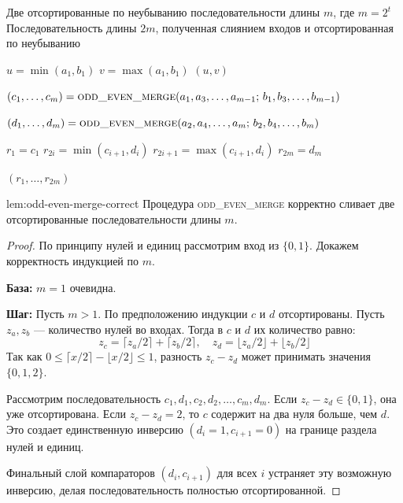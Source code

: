 \begin{algorithm}[H]
	\caption{\textsc{odd\_even\_merge}$(a_1,\dots,a_m;\, b_1,\dots,b_m)$}
	\begin{algorithmic}[1]
		\Require Две отсортированные по неубыванию последовательности длины $m$, где $m=2^t$
		\Ensure Последовательность длины $2m$, полученная слиянием входов и отсортированная по неубыванию
		
		\State $u = \min(a_1,b_1)$
		\State $v = \max(a_1,b_1)$
		\State \Return $(u,v)$
		\EndIf
		
		\State $(c_1,\dots,c_m) = \textsc{odd\_even\_merge}(a_1,a_3,\dots,a_{m-1};\, b_1,b_3,\dots,b_{m-1})$
		
		\State $(d_1,\dots,d_m) = \textsc{odd\_even\_merge}(a_2,a_4,\dots,a_m;\, b_2,b_4,\dots,b_m)$
		
		\State $r_1 = c_1$
		\State $r_{2i} = \min(c_{i+1}, d_i)$
		\State $r_{2i+1} = \max(c_{i+1}, d_i)$
		\EndFor
		\State $r_{2m} = d_m$
		
		\State \Return $(r_1,\dots,r_{2m})$
	\end{algorithmic}
\end{algorithm}


\begin{Lemma}{}{lem:odd-even-merge-correct}
	Процедура \textsc{odd\_even\_merge} корректно сливает две отсортированные последовательности длины $m$.
\end{Lemma}

\begin{proof}
	По принципу нулей и единиц рассмотрим вход из $\{0,1\}$. Докажем корректность индукцией по $m$.
	
	\textbf{База:} $m=1$ очевидна.
	
	\textbf{Шаг:} Пусть $m > 1$. По предположению индукции $c$ и $d$ отсортированы. Пусть $z_a, z_b$ — количество нулей во входах. Тогда в $c$ и $d$ их количество равно:
	\[ z_c = \lceil z_a/2 \rceil + \lceil z_b/2 \rceil, \quad z_d = \lfloor z_a/2 \rfloor + \lfloor z_b/2 \rfloor \]
	Так как $0 \le \lceil x/2 \rceil - \lfloor x/2 \rfloor \le 1$, разность $z_c - z_d$ может принимать значения $\{0, 1, 2\}$.
	
	Рассмотрим последовательность $c_1, d_1, c_2, d_2, \dots, c_m, d_m$. 
	Если $z_c - z_d \in \{0, 1\}$, она уже отсортирована. Если $z_c - z_d = 2$, то $c$ содержит на два нуля больше, чем $d$. Это создает единственную инверсию $(d_i=1, c_{i+1}=0)$ на границе раздела нулей и единиц. 
	
	Финальный слой компараторов $(d_i, c_{i+1})$ для всех $i$ устраняет эту возможную инверсию, делая последовательность полностью отсортированной.
\end{proof}

